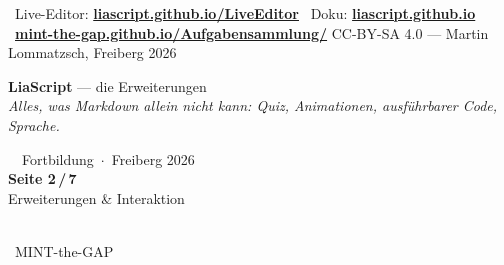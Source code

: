 \documentclass[a4paper,landscape,9pt]{extarticle}
\newcommand{\sheetfooter}{%
  \vfill
  {\sffamily\scriptsize\color{muted}
  \faInfoCircle~Live-Editor: \href{https://liascript.github.io/LiveEditor/}{\textbf{liascript.github.io/LiveEditor}}\hfill
  \faBook~Doku: \href{https://liascript.github.io}{\textbf{liascript.github.io}}\hfill
  \faGithub~\href{https://mint-the-gap.github.io/Aufgabensammlung/}{\textbf{mint-the-gap.github.io/Aufgabensammlung/}} \quad
  CC-BY-SA 4.0 — Martin Lommatzsch, Freiberg 2026}}
\begin{document}
\sheetfooter

\newpage

\noindent\begin{tcolorbox}[
  enhanced, frame hidden, sharp corners,
  colback=liagreen, coltext=white,
  left=12pt, right=8pt, top=4pt, bottom=4pt,
  before skip=0pt, after skip=4pt,
  width=\linewidth,
  borderline west={4pt}{-4pt}{liagreen!55}
]
\begin{minipage}[c]{0.66\linewidth}
  {\sffamily\fontsize{26}{28}\selectfont\bfseries LiaScript}\hspace{0.4em}%
  {\sffamily\large\color{white!75} — die Erweiterungen}\\[2pt]
  {\sffamily\footnotesize\itshape\color{white!90} Alles, was Markdown allein nicht kann: Quiz, Animationen, ausführbarer Code, Sprache.}
\end{minipage}\hfill
\begin{minipage}[c]{0.20\linewidth}\raggedright
  {\sffamily\scriptsize\color{white!85}\faGraduationCap~~Fortbildung~$\cdot$~Freiberg 2026}\\[2pt]
  {\sffamily\bfseries\normalsize Seite 2\,/\,7}\\[1pt]
  {\sffamily\scriptsize\color{white!75} Erweiterungen \& Interaktion}
\end{minipage}\hfill
\begin{minipage}[c]{0.10\linewidth}\centering
  {\color{black}\colorbox{white}{\hspace{1pt}\hspace{1pt}}}\\[1pt]
  {\sffamily\scriptsize\color{white!90}\faGithub~MINT-the-GAP}
\end{minipage}
\end{tcolorbox}

\newcommand{\aufglia}[1]{\hfill{\sffamily\scriptsize\color{white!85}\faTasks~A#1}}
\end{document}
